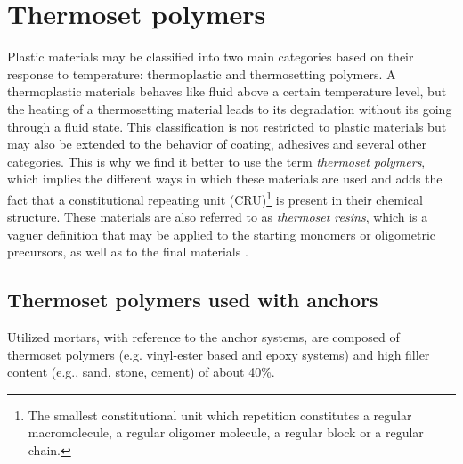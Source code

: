 \thispagestyle{plain}
\section{Thermoset polymers}\label{sec:thermo_polymers}

Plastic materials may be classified into two main categories based on their response to temperature: thermoplastic and thermosetting polymers. A thermoplastic materials behaves like fluid above a certain temperature level, but the heating of a thermosetting material leads to its degradation without its going through a fluid state. This classification is not restricted to plastic materials but may also be extended to the behavior of coating, adhesives and several other categories. This is why we find it better to use the term \textit{thermoset polymers}, which implies the different ways in which these materials are used and adds the fact that a constitutional repeating unit (CRU)\footnote{The smallest constitutional unit which repetition constitutes a regular macromolecule, a regular oligomer molecule, a regular block or a regular chain.} is present in their chemical structure. These materials are also referred to as \textit{thermoset resins}, which is a vaguer definition that may be applied to the starting monomers or oligometric precursors, as well as to the final materials \cite{thermosetting_polymers}. 

\subsection{Thermoset polymers used with anchors}\label{subsec:polymers_in_anchors}
Utilized mortars, with reference to the anchor systems, are composed of thermoset polymers (e.g. vinyl-ester based and epoxy systems) and high filler content (e.g., sand, stone, cement) of about 40\%.

